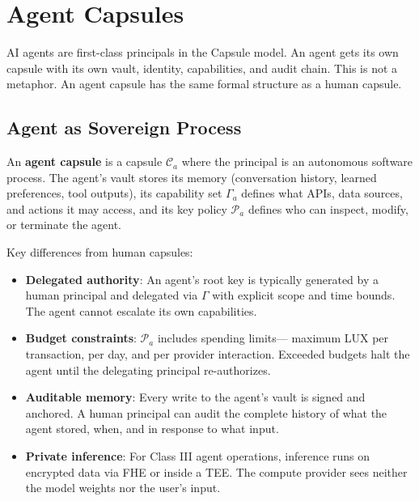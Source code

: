 \section{Agent Capsules}
\label{sec:agents}

AI agents are first-class principals in the Capsule model. An agent gets its
own capsule with its own vault, identity, capabilities, and audit chain.
This is not a metaphor. An agent capsule has the same formal structure as a
human capsule.

\subsection{Agent as Sovereign Process}

\begin{definition}\label{def:agent}
An \textbf{agent capsule} is a capsule $\mathcal{C}_a$ where the principal is
an autonomous software process. The agent's vault stores its memory (conversation
history, learned preferences, tool outputs), its capability set $\Gamma_a$
defines what APIs, data sources, and actions it may access, and its key policy
$\mathcal{P}_a$ defines who can inspect, modify, or terminate the agent.
\end{definition}

Key differences from human capsules:

\begin{itemize}[nosep]
  \item \textbf{Delegated authority}: An agent's root key is typically generated
        by a human principal and delegated via $\Gamma$ with explicit scope
        and time bounds. The agent cannot escalate its own capabilities.
  \item \textbf{Budget constraints}: $\mathcal{P}_a$ includes spending limits---
        maximum LUX per transaction, per day, and per provider interaction.
        Exceeded budgets halt the agent until the delegating principal
        re-authorizes.
  \item \textbf{Auditable memory}: Every write to the agent's vault is signed
        and anchored. A human principal can audit the complete history of what
        the agent stored, when, and in response to what input.
  \item \textbf{Private inference}: For Class III agent operations, inference
        runs on encrypted data via FHE or inside a TEE. The compute provider
        sees neither the model weights nor the user's input.
\end{itemize}


